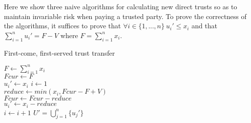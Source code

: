 \documentclass[11pt]{article}
\theoremstyle{definition}
\theoremstyle{corollary}
\begin{document}
    Here we show three naive algorithms for calculating new direct trusts so as to maintain invariable risk when paying
    a trusted party. To prove the correctness of the algorithms, it suffices to prove that $\forall i \in \{1,...,n\} \:
    u_i' \leq x_i$ and that $\sum\limits_{i=1}^{n}u_i' = F - V$ where $F = \sum\limits_{i=1}^{n}x_i$. \\
    \begin{algorithm}[H]
       \label{fcfs}
       \caption{First-come, first-served trust transfer}
       $F \gets \sum\limits_{i=1}^{n}x_i$ \\
       $Fcur \gets F$ \\
          {$u_i' \gets x_i$} 
       $i \gets 1$ \\
          {$reduce \gets min(x_i, Fcur - F + V)$ \\
           $Fcur \gets Fcur - reduce$ \\
           $u_i' \gets x_i - reduce$ \\
           $i \gets i + 1$}
       \Return $U' = \bigcup\limits_{j=1}^{n}\{u_j'\}$
    \end{algorithm}
\end{document}

